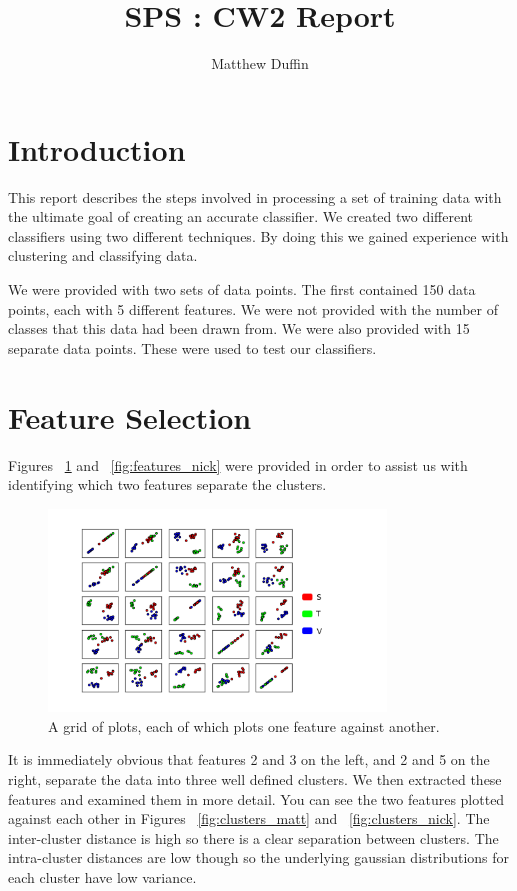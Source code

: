 \documentclass[11pt, a4paper]{article}
\title{SPS : CW2 Report}
\author{Matthew Duffin}
\begin{document}
\maketitle

\section{Introduction}
This report describes the steps involved in processing a set of training data with the ultimate goal of creating an accurate classifier. We created two different classifiers using two different techniques. By doing this we gained experience with clustering and classifying data. 

We were provided with two sets of data points. The first contained 150 data points, each with 5 different features. We were not provided with the number of classes that this data had been drawn from. We were also provided with 15 separate data points. These were used to test our classifiers. 

\section{Feature Selection}
Figures ~\ref{fig:feature_matrix} and ~\ref{fig:features_nick} were provided in order to assist us with identifying which two features separate the clusters.

\begin{figure}[ht]
	\centering
	\includegraphics[trim={0 1cm 3cm 1cm},clip,width=0.8\textwidth]{feature_matrix_leg.png}
	\caption{A grid of plots, each of which plots one feature against another.}
	\label{fig:feature_matrix}
\end{figure}

It is immediately obvious that features 2 and 3 on the left, and 2 and 5 on the right, separate the data into three well defined clusters. We then extracted these features and examined them in more detail. You can see the two features plotted against each other in Figures ~\ref{fig:clusters_matt} and ~\ref{fig:clusters_nick}. The inter-cluster distance is high so there is a clear separation between clusters. The intra-cluster distances are low though so the underlying gaussian distributions for each cluster have low variance. 
\end{document}
